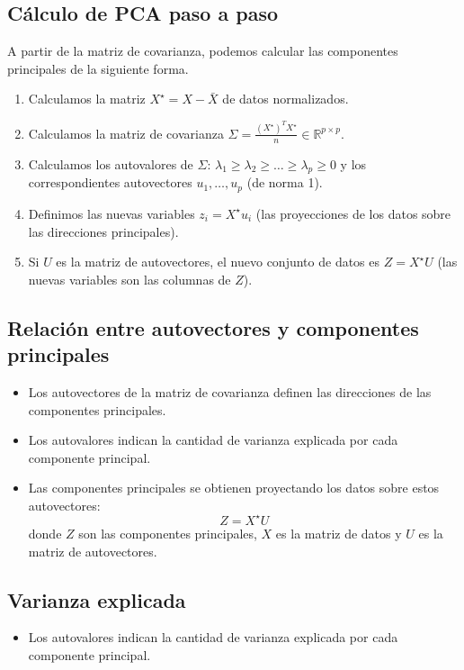 \documentclass[a4paper]{article}
\newcommand{\R}{{\mathbb R}}
\begin{document}
\subsection{Cálculo de PCA paso a paso}

A partir de la matriz de covarianza, podemos calcular las componentes principales de la siguiente forma.

    \begin{enumerate}
        \item Calculamos la matriz $X^\star = X - \bar X$ de datos normalizados.
        \item Calculamos la matriz de covarianza $\Sigma = \frac{(X^\star)^T X^\star}{n} \in \R^{p \times p}$.
        \item Calculamos los autovalores de $\Sigma$: $\lambda_1 \ge \lambda_2 \ge  \dots \ge \lambda_p \ge 0$ y los correspondientes autovectores $u_1, \dots, u_p$ (de norma 1).

        \item Definimos las nuevas variables $z_i = X^\star u_i$ (las proyecciones de los datos sobre las direcciones principales).
        \item Si $U$ es la matriz de autovectores, el nuevo conjunto de datos es $Z = X^\star U$ (las nuevas variables son las columnas de $Z$).
    \end{enumerate}

\subsection{Relación entre autovectores y componentes principales}
\begin{itemize}
    \item Los autovectores de la matriz de covarianza definen las direcciones de las componentes principales.
    \item Los autovalores indican la cantidad de varianza explicada por cada componente principal.
    \item Las componentes principales se obtienen proyectando los datos sobre estos autovectores:
\[
Z = X^\star U
\]
donde $Z$ son las componentes principales, \( {X} \) es la matriz de datos y \( {U} \) es la matriz de autovectores.
\end{itemize}

\subsection{Varianza explicada}
\begin{itemize}
    \item Los autovalores indican la cantidad de varianza explicada por cada componente principal.
\end{itemize}
\end{document}
